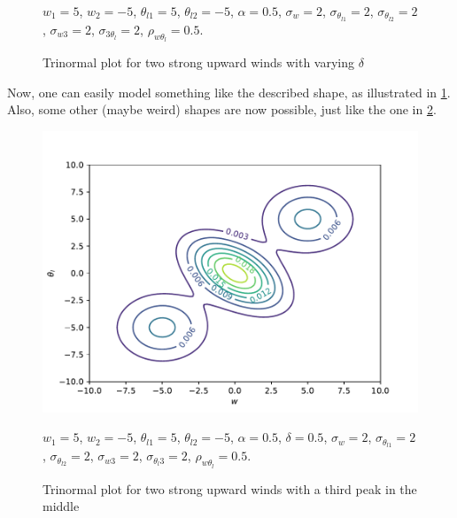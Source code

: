 \begin{figure}[!htb]
\begin{tabular}{cc}
    \end{tabular}
    \caption{Trinormal plot for two strong upward winds with varying $\delta$}
    \label{fig:plot3}
    $w_1 = 5$, $w_2 = -5$, $\theta_{l1} = 5$, $\theta_{l2} = -5$,
    $\alpha = 0.5$, $\sigma_w = 2$, $\sigma_{\theta_{l1}} = 2$,  $\sigma_{\theta_{l2}} = 2$,
    $\sigma_{w3} = 2$, $\sigma_{3\theta_l} = 2$, $\rho_{w\theta_l} = 0.5$.
\end{figure}
Now, one can easily model something like the described shape,
as illustrated in \cref{fig:plot3}.
Also, some other (maybe weird) shapes are now possible,
just like the one in \cref{fig:plot4}.
\begin{figure}[!htb]
    \centering
    \includegraphics[width=.5\textwidth]{include/figures/plot4}
    \caption{Trinormal plot for two strong upward winds with a third peak in the middle}
    \label{fig:plot4}
    $w_1 = 5$, $w_2 = -5$, $\theta_{l1} = 5$, $\theta_{l2} = -5$,
    $\alpha = 0.5$, $\delta=0.5$, $\sigma_w = 2$, $\sigma_{\theta_{l1}} = 2$,
    $\sigma_{\theta_{l2}} = 2$, $\sigma_{w3} = 2$, $\sigma_{\theta_l 3} = 2$,
    $\rho_{w\theta_l} = 0.5$.
\end{figure}
